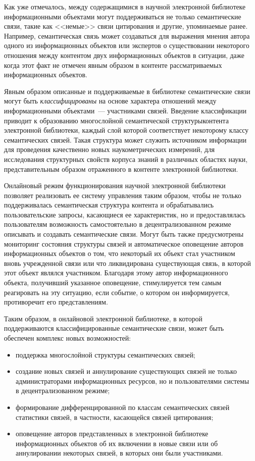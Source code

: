 \begin{multicols}{2}
  Как уже отмечалось, между содержащимися в научной электронной 
библиотеке информационными объектами могут поддерживаться не только 
семантические связи, такие как <<немые>> связи цитирования и другие, 
упоминаемые ранее. Например, семантическая связь может создаваться для 
выражения мнения автора одного из информационных объектов или экспертов 
о существовании некоторого отношения между контентом двух 
информационных объектов в ситуации, даже когда этот факт не отмечен явным 
образом в контенте рассматриваемых информационных объектов. 
  
  Явным образом описанные и поддерживаемые в библиотеке семантические 
связи могут быть \textit{классифицированы} на основе характера отношений 
между информационными объектами~--- участниками связей. Введение 
классификации приводит к образованию многослойной семантической 
структуры\linebreak контента электронной библиотеки, каждый слой которой 
соответствует некоторому классу семантических связей. Такая структура может 
служить источни\-ком информации для проведения качественно новых 
наукометрических измерений, для исследования структурных свойств корпуса 
знаний в различных областях науки, представительным образом отраженного в 
контенте электронной библиотеки. 
  
  Онлайновый режим функционирования научной электронной библиотеки 
позволяет реализовать ее систему управления таким образом, чтобы не только 
поддерживалась семантическая структура контента и обрабатывались 
пользовательские запросы, касающиеся ее характеристик, но и предостав\-лялась 
пользователям возможность самостоятельно в децентрализованном режиме 
описывать и создавать семантические связи. Могут быть также предусмотрены 
мониторинг состояния структуры связей и автоматическое оповещение авторов 
информационных объектов о том, что некоторый их объект стал участником 
вновь учрежденной связи или что ликвидирована существующая связь, в 
которой этот объект являлся участником. Благодаря этому автор 
информационного объекта, получивший указанное оповещение, стимулируется 
тем самым реагировать на эту ситуацию, если событие, о котором он 
информируется, противоречит его представлениям.
  
  Таким образом, в онлайновой электронной биб\-лио\-те\-ке, в которой 
поддерживаются классифицированные семантические связи, может быть 
обеспечен комплекс новых возможностей:
  \begin{itemize}
\item поддержка многослойной структуры семантических связей;
\item создание новых связей и аннулирование существующих связей не 
только администраторами информационных ресурсов, но и пользователями 
системы в децентрализованном режиме;
\item формирование дифференцированной по классам семантических связей 
статистики связей, в частности, касающейся связей цитирования;
\item оповещение авторов представленных в электронной библиотеке 
информационных объектов об их включении в новые связи или об 
аннулировании некоторых связей, в которых они были участниками. 
\end{itemize}


\end{multicols}
